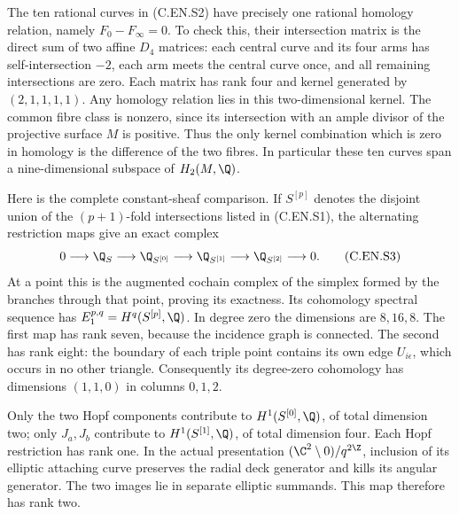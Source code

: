 The ten rational curves in (C.EN.S2) have precisely one rational
homology relation, namely $F_0-F_\infty=0$. To check this,
their intersection matrix is the direct sum of two affine
$D_4$ matrices: each central curve and its four arms has
self-intersection $-2$, each arm meets the central curve
once, and all remaining intersections are zero. Each matrix
has rank four and kernel generated by $(2,1,1,1,1)$.
Any homology relation lies in this two-dimensional kernel.
The common fibre class is nonzero, since its intersection
with an ample divisor of the projective surface $M$ is
positive. Thus the only kernel combination which is zero in
homology is the difference of the two fibres. In particular
these ten curves span a nine-dimensional subspace of
$H_2(M,\Q)$.

Here is the complete constant-sheaf comparison. If $S^{[p]}$
denotes the disjoint union of the $(p+1)$-fold intersections
listed in (C.EN.S1), the alternating restriction maps give
an exact complex
\[
 0\longrightarrow\Q_S\longrightarrow\Q_{S^{[0]}}
 \longrightarrow\Q_{S^{[1]}}
 \longrightarrow\Q_{S^{[2]}}\longrightarrow0.           \tag{C.EN.S3}
\]
At a point this is the augmented cochain complex of the
simplex formed by the branches through that point, proving
its exactness. Its cohomology spectral sequence has
$E_1^{p,q}=H^q(S^{[p]},\Q)$.
In degree zero the dimensions are $8,16,8$. The first
map has rank seven, because the incidence graph is connected.
The second has rank eight: the boundary of each triple
point contains its own edge $U_{i\epsilon}$, which occurs
in no other triangle. Consequently its degree-zero cohomology
has dimensions $(1,1,0)$ in columns $0,1,2$.

Only the two Hopf components contribute to $H^1(S^{[0]},\Q)$,
of total dimension two; only $J_a,J_b$ contribute to
$H^1(S^{[1]},\Q)$, of total dimension four.
Each Hopf restriction has rank one. In the actual presentation
$(\C^2\setminus0)/q^{2\Z}$, inclusion of its elliptic
attaching curve preserves the radial deck generator and
kills its angular generator. The two images lie in separate
elliptic summands. This map therefore has rank two.

